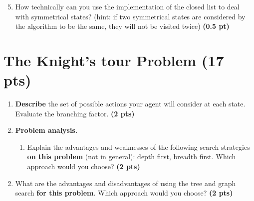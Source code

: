 \documentclass[11pt,a4paper]{report}
\begin{document}
\begin{answer}
\end{answer}



\begin{enumerate}
\setcounter{enumi}{4}
    \item How technically can you use the implementation of the closed list to deal with symmetrical states? (hint: if two symmetrical states are considered by the algorithm to be the same, they will not be visited twice) \textbf{(0.5 pt)}
\end{enumerate}

\begin{answer}
\end{answer}




\section{The Knight's tour Problem (17 pts)}

\begin{enumerate}
  \item \textbf{Describe} the set of possible actions your agent will consider at each state. Evaluate the branching factor. \textbf{(2 pts)}
\end{enumerate}

\begin{answer}
\end{answer}



\begin{enumerate}
\setcounter{enumi}{1}
    \item \textbf{Problem analysis.}
    \begin{enumerate}
        \item Explain the advantages and weaknesses of the following search strategies \textbf{on this problem} (not in general): depth first, breadth first. Which approach would you choose? \textbf{(2 pts)}
    \end{enumerate}
\end{enumerate}

\begin{answer}
\end{answer}



\begin{enumerate}
\setcounter{enumi}{1}
\begin{enumerate}
\setcounter{enumii}{1}
    \item What are the advantages and disadvantages of using the tree and graph search \textbf{for this problem}. Which approach would you choose? \textbf{(2 pts)}
\end{enumerate}
\end{enumerate}
\end{document}
